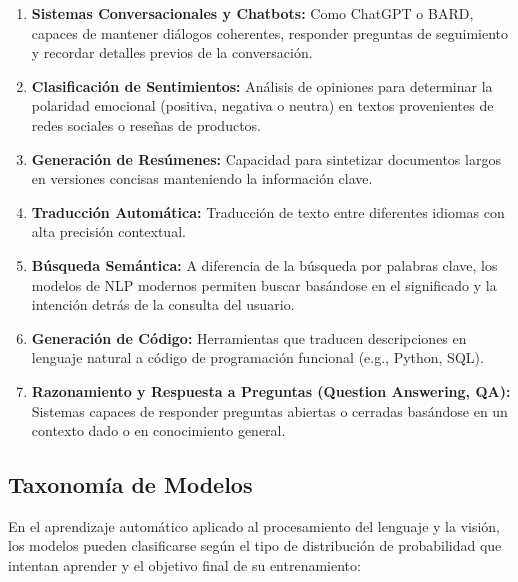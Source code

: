 \documentclass[11pt, a4paper]{article}
\begin{document}
\begin{enumerate}
    \item \textbf{Sistemas Conversacionales y Chatbots:} Como ChatGPT o BARD, capaces de mantener diálogos coherentes, responder preguntas de seguimiento y recordar detalles 
    previos de la conversación.
    \item \textbf{Clasificación de Sentimientos:} Análisis de opiniones para determinar la polaridad emocional (positiva, negativa o neutra) en textos provenientes de redes 
    sociales o reseñas de productos.
    \item \textbf{Generación de Resúmenes:} Capacidad para sintetizar documentos largos en versiones concisas manteniendo la información clave.
    \item \textbf{Traducción Automática:} Traducción de texto entre diferentes idiomas con alta precisión contextual.
    \item \textbf{Búsqueda Semántica:} A diferencia de la búsqueda por palabras clave, los modelos de NLP modernos permiten buscar basándose en el significado y la intención 
    detrás de la consulta del usuario.
    \item \textbf{Generación de Código:} Herramientas que traducen descripciones en lenguaje natural a código de programación funcional (e.g., Python, SQL).
    \item \textbf{Razonamiento y Respuesta a Preguntas (Question Answering, QA):} Sistemas capaces de responder preguntas abiertas o cerradas basándose en un contexto dado 
    o en conocimiento general.
\end{enumerate}

\subsection{Taxonomía de Modelos}

En el aprendizaje automático aplicado al procesamiento del lenguaje y la visión, los modelos pueden clasificarse según el tipo
de distribución de probabilidad que intentan aprender y el objetivo final de su entrenamiento:
\end{document}
